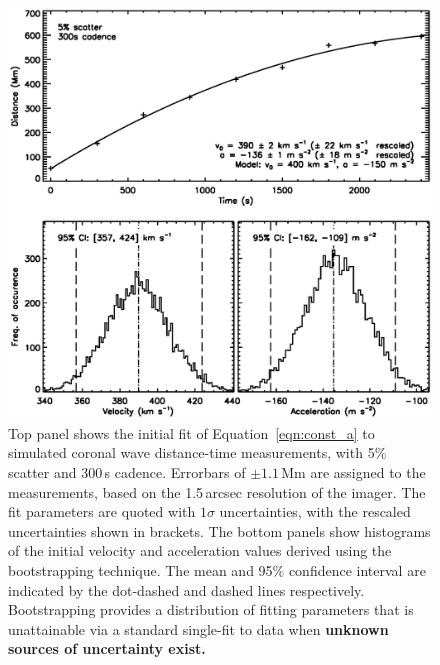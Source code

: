 \documentclass[structabstract]{aa}
\begin{document}
\begin{figure}
\begin{center}
\includegraphics[scale=0.45, trim=20 50 0 0, clip=true]{images/cad_boot_weight_jpb.eps}
\caption{Top panel shows the initial fit of Equation~\ref{eqn:const_a} to simulated coronal wave distance-time measurements, with 5\% scatter and 300\,s cadence. Errorbars of $\pm1.1$\,Mm are assigned to the measurements, based on the 1.5\,arcsec resolution of the imager. The fit parameters are quoted with $1\sigma$ uncertainties, with the rescaled uncertainties shown in brackets. The bottom panels show histograms of the initial velocity and acceleration values derived using the bootstrapping technique. The mean and 95\% confidence interval are indicated by the dot-dashed and dashed lines respectively. Bootstrapping provides a distribution of fitting parameters that is unattainable via a standard single-fit to data when {\bf unknown sources of uncertainty exist.}}
\label{cad_boot_weight}
\end{center}
\end{figure}
\end{document}
